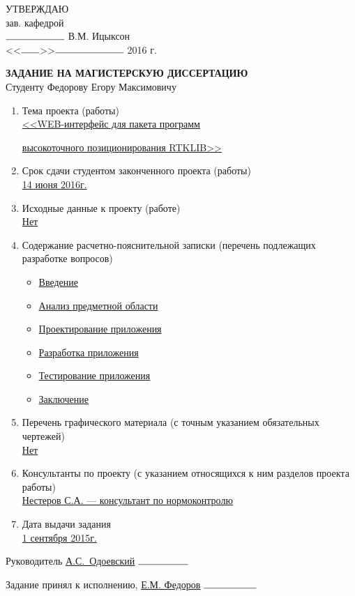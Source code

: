 

\newcommand{\offset}{5.6cm}
\newcommand{\ruleD}{0.15mm}



\hfill\begin{minipage}{\dimexpr\textwidth-\offset}
УТВЕРЖДАЮ \\
зав. кафедрой \\
$\rule{2.1cm}{\ruleD}$ В.М. Ицыксон \\
<<$\rule{0.65cm}{\ruleD}$>>$\rule{2.45cm}{\ruleD}$ 2016 г.\\[1.0cm]
\end{minipage}




\begin{center}
\textbf{ЗАДАНИЕ НА МАГИСТЕРСКУЮ ДИССЕРТАЦИЮ}\\
Студенту Федорову Егору Максимовичу\\
\end{center}


\begin{enumerate}
	\item Тема проекта (работы)\\
		\underline{<<WEB-интерфейс для пакета программ}

		\underline{высокоточного позиционирования RTKLIB>>}
	\item Срок сдачи студентом законченного проекта (работы)\\
		\underline{14 июня 2016г.}
	\item Исходные данные к проекту (работе)\\
		\underline{Нет}
	\item Содержание расчетно-пояснительной записки (перечень подлежащих разработке вопросов)\\
		\begin{itemize}
			\item \underline{Введение}
			\item \underline{Анализ предметной области}
			\item \underline{Проектирование приложения}
			\item \underline{Разработка приложения}
			\item \underline{Тестирование приложения}
			\item \underline{Заключение}
		\end{itemize}
	\item Перечень графического материала (с точным указанием обязательных чертежей)\\
		\underline{Нет}
	\item Консультанты по проекту (с указанием относящихся к ним разделов проекта работы)\\
		\underline{Нестеров С.А. --- консультант по нормоконтролю}
	\item Дата выдачи задания\\
		\underline{1 сентября 2015г.}
\end{enumerate}




Руководитель \underline{А.С.~Одоевский} \hspace{1.9cm} $\rule{1.8cm}{\ruleD}$

Задание принял к исполнению, \underline{Е.М. Федоров} \hspace{0.47cm}$\rule{1.9cm}{\ruleD}$


\thispagestyle{empty}
